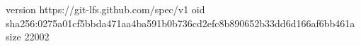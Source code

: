 version https://git-lfs.github.com/spec/v1
oid sha256:0275a01cf5bbda471aa4ba591b0b736cd2efc8b890652b33dd6d166af6bb461a
size 22002
